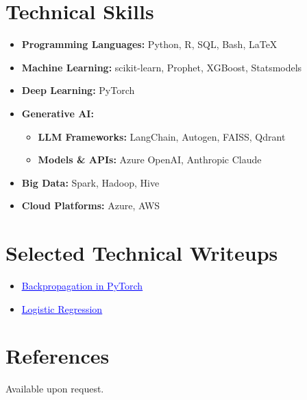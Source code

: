 \documentclass[11pt,a4paper]{moderncv}
\begin{document}
\begin{minipage}[t]{0.32\textwidth}
\section*{Technical Skills}
\begin{itemize}
    \item \textbf{Programming Languages:} Python, R, SQL, Bash, \LaTeX
    \item \textbf{Machine Learning:} scikit-learn, Prophet, XGBoost, Statsmodels
    \item \textbf{Deep Learning:} PyTorch
    \item \textbf{Generative AI:} 
    \begin{itemize}
        \item \textbf{LLM Frameworks:} LangChain, Autogen, FAISS, Qdrant
        \item \textbf{Models \& APIs:} Azure OpenAI, Anthropic Claude
    \end{itemize}
    \item \textbf{Big Data:} Spark, Hadoop, Hive
    \item \textbf{Cloud Platforms:} Azure, AWS
\end{itemize}

\vspace{-3.0mm}
\section*{Selected Technical Writeups}
\begin{itemize}
    \item \href{https://sayan.github.io/dl-lecture-notes/neural_network_and_deep_learning/pytorch/06_pytorch_back_propagation_linear_layer.html}{\textcolor{blue}{\underline{Backpropagation in PyTorch}}}
    \item \href{https://sayan.github.io/dl-lecture-notes/neural_network_and_deep_learning/logreg/logreg}{\textcolor{blue}{\underline{Logistic Regression}}}
\end{itemize}

\vspace{-3.0mm}
\section*{References}
Available upon request.

\end{minipage}
\end{document}
